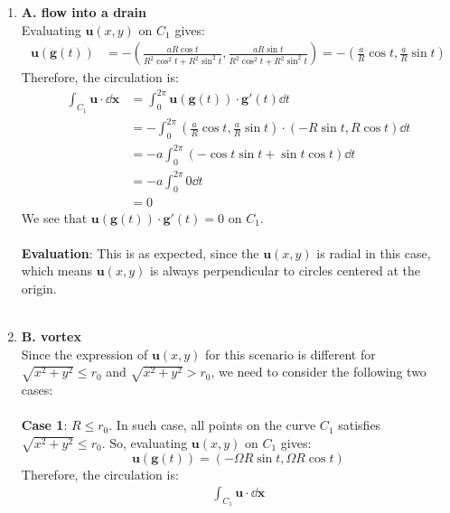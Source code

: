 \documentclass{article}
\begin{document}
\begin{enumerate}
\begin{enumerate}
\begin{equation}
  \end{equation}
  \begin{enumerate}
    \item \textbf{A. flow into a drain}\\
    Evaluating \(\mathbf{u}(x,y)\) on \(C_1\) gives:
    \begin{align}
      \mathbf{u}(\mathbf{g}(t))
      &= -\left(\frac{a R\cos t}{R^2\cos^2 t + R^2\sin^2 t}, \frac{aR\sin t}{R^2\cos^2 t + R^2\sin^2 t}\right)
      = -\left(\frac{a}{R}\cos t, \frac{a}{R}\sin t\right)
    \end{align}
    Therefore, the circulation is:
    \begin{align*}
      \int_{C_1} \mathbf{u}\cdot \dd \mathbf{x}
      &= \int_{0}^{2\pi} \mathbf{u}(\mathbf{g}(t))\cdot \mathbf{g}'(t) \dd t\\
      &= -\int_{0}^{2\pi} \left(\frac{a}{R}\cos t, \frac{a}{R}\sin t\right) \cdot (-R\sin t, R\cos t) \dd t \\
      &= -a\int_{0}^{2\pi}(-\cos t\sin t + \sin t \cos t) \dd t\\
      &= -a\int_{0}^{2\pi} 0 \dd t\\
      &= 0
    \end{align*}
    We see that \(\mathbf{u}(\mathbf{g}(t))\cdot \mathbf{g}'(t) = 0\) on \(C_1\).\\
    \\
    \textbf{Evaluation}: This is as expected, since the \(\mathbf{u}(x,y)\) is radial in this case, which means \(\mathbf{u}(x,y)\)
    is always perpendicular to circles centered at the origin. \\
    \\
    \item \textbf{B. vortex}\\
    Since the expression of \(\mathbf{u}(x,y)\) for this scenario is different for \(\sqrt{x^2+y^2}\le r_0\) and \(\sqrt{x^2+y^2}> r_0\), we need to consider the following two cases:\\
    \\
    \textbf{Case 1}: \(R\le r_0\). In such case, all points on the curve \(C_1\) satisfies \(\sqrt{x^2+y^2}\le r_0\).
    So, evaluating \(\mathbf{u}(x,y)\) on \(C_1\) gives:
    \begin{equation}
      \mathbf{u}(\mathbf{g}(t)) = (-\Omega R\sin t, \Omega R\cos t)
    \end{equation}
    Therefore, the circulation is:
    \begin{align*}
      \int_{C_1} \mathbf{u}\cdot \dd \mathbf{x}

\end{align*}
\end{enumerate}
\end{enumerate}
\end{enumerate}
\end{document}

